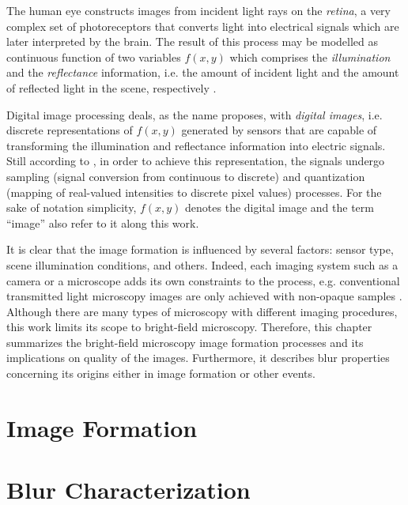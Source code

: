 











The human eye constructs images from incident light rays on the \emph{retina}, a very complex set of photoreceptors that converts light into electrical signals which are later interpreted by the brain. The result of this process may be modelled as continuous function of two variables $f(x,y)$ which comprises the \emph{illumination} and the \emph{reflectance} information, i.e. the amount of incident light and the amount of reflected light in the scene, respectively \cite{gonzalez2018digital}.

Digital image processing deals, as the name proposes, with \emph{digital images}, i.e. discrete representations of $f(x,y)$ generated by sensors that are capable of transforming the illumination and reflectance information into electric signals. Still according to , in order to achieve this representation, the signals undergo sampling (signal conversion from continuous to discrete) and quantization (mapping of real-valued intensities to discrete pixel values) processes. For the sake of notation simplicity, $f(x,y)$ denotes the digital image and the term ``image'' also refer to it along this work.

It is clear that the image formation is influenced by several factors: sensor type, scene illumination conditions, and others. Indeed, each imaging system such as a camera or a microscope adds its own constraints to the process, e.g. conventional transmitted light microscopy images are only achieved with non-opaque samples \cite{rudi2020contrast}. Although there are many types of microscopy with different imaging procedures, this work limits its scope to bright-field microscopy. Therefore, this chapter summarizes the bright-field microscopy image formation processes and its implications on quality of the images. Furthermore, it describes blur properties concerning its origins either in image formation or other events. 

\section{Image Formation}


\section{Blur Characterization}

